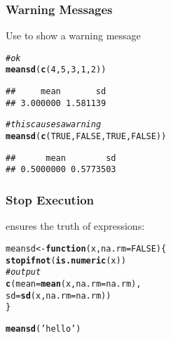 \documentclass[12pt]{beamer}\usepackage[]{graphicx}\usepackage[]{color}
\makeatletter
\newcommand{\hlnum}[1]{\textcolor[rgb]{0.686,0.059,0.569}{#1}}%
\newcommand{\hlstr}[1]{\textcolor[rgb]{0.192,0.494,0.8}{#1}}%
\newcommand{\hlcom}[1]{\textcolor[rgb]{0.678,0.584,0.686}{\textit{#1}}}%
\newcommand{\hlstd}[1]{\textcolor[rgb]{0.345,0.345,0.345}{#1}}%
\newcommand{\hlkwa}[1]{\textcolor[rgb]{0.161,0.373,0.58}{\textbf{#1}}}%
\newcommand{\hlkwb}[1]{\textcolor[rgb]{0.69,0.353,0.396}{#1}}%
\newcommand{\hlkwc}[1]{\textcolor[rgb]{0.333,0.667,0.333}{#1}}%
\newcommand{\hlkwd}[1]{\textcolor[rgb]{0.737,0.353,0.396}{\textbf{#1}}}%
\newenvironment{kframe}{%
 \def\at@end@of@kframe{}%
 \ifinner\ifhmode%
  \def\at@end@of@kframe{\end{minipage}}%
  \begin{minipage}{\columnwidth}%
 \fi\fi%
 \def\FrameCommand##1{\hskip\@totalleftmargin \hskip-\fboxsep
 \colorbox{shadecolor}{##1}\hskip-\fboxsep
     \hskip-\linewidth \hskip-\@totalleftmargin \hskip\columnwidth}%
 \MakeFramed {\advance\hsize-\width
   \@totalleftmargin\z@ \linewidth\hsize
   \@setminipage}}%
 {\par\unskip\endMakeFramed%
 \at@end@of@kframe}
\newenvironment{knitrout}{}{} %
\makeatother
\begin{document}

\begin{frame}[fragile]
\frametitle{Warning Messages}

Use {\hilit {}} to show a warning message
\begin{knitrout}\footnotesize
{}\color{fgcolor}\begin{kframe}
\begin{alltt}
\hlcom{# ok}
\hlkwd{meansd}\hlstd{(}\hlkwd{c}\hlstd{(}\hlnum{4}\hlstd{,} \hlnum{5}\hlstd{,} \hlnum{3}\hlstd{,} \hlnum{1}\hlstd{,} \hlnum{2}\hlstd{))}
\end{alltt}
\begin{verbatim}
##     mean       sd 
## 3.000000 1.581139
\end{verbatim}
\begin{alltt}
\hlcom{# this causes a warning}
\hlkwd{meansd}\hlstd{(}\hlkwd{c}\hlstd{(}\hlnum{TRUE}\hlstd{,} \hlnum{FALSE}\hlstd{,} \hlnum{TRUE}\hlstd{,} \hlnum{FALSE}\hlstd{))}
\end{alltt}


{\ttfamily\noindent\color{warningcolor}{\#\# Warning in meansd(c(TRUE, FALSE, TRUE, FALSE)): non-numeric input coerced to numeric}}\begin{verbatim}
##      mean        sd 
## 0.5000000 0.5773503
\end{verbatim}
\end{kframe}
\end{knitrout}

\end{frame}


\begin{frame}[fragile]
\frametitle{Stop Execution}

{\hilit {}} ensures the truth of expressions:
\begin{knitrout}\footnotesize
{}\color{fgcolor}\begin{kframe}
\begin{alltt}
\hlstd{meansd} \hlkwb{<-} \hlkwa{function}\hlstd{(}\hlkwc{x}\hlstd{,} \hlkwc{na.rm} \hlstd{=} \hlnum{FALSE}\hlstd{) \{}
  \hlkwd{stopifnot}\hlstd{(}\hlkwd{is.numeric}\hlstd{(x))}
  \hlcom{# output}
  \hlkwd{c}\hlstd{(}\hlkwc{mean} \hlstd{=} \hlkwd{mean}\hlstd{(x,} \hlkwc{na.rm} \hlstd{= na.rm),}
    \hlkwc{sd} \hlstd{=} \hlkwd{sd}\hlstd{(x,} \hlkwc{na.rm} \hlstd{= na.rm))}
\hlstd{\}}

\hlkwd{meansd}\hlstd{(}\hlstr{'hello'}\hlstd{)}
\end{alltt}


{\ttfamily\noindent\bfseries\color{errorcolor}{\#\# Error: is.numeric(x) is not TRUE}}\end{kframe}
\end{knitrout}

\end{frame}
\end{document}
